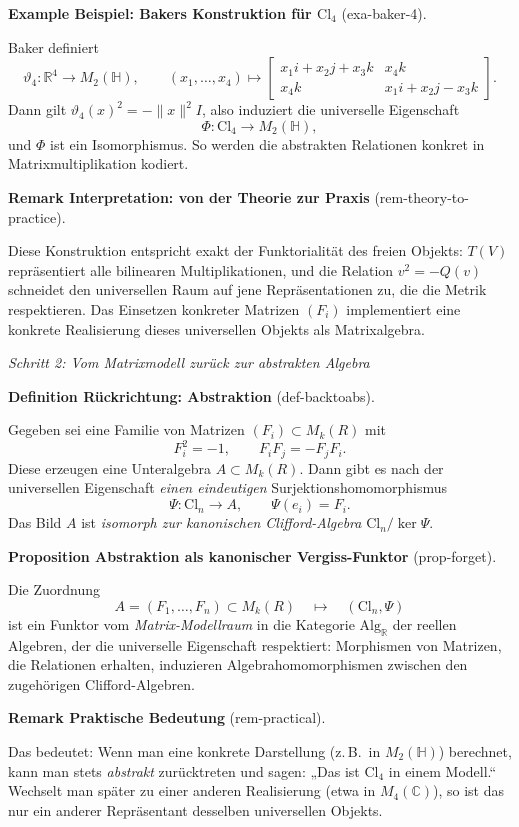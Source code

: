 \documentclass[10pt, letterpaper]{article}
\newcommand{\R}{\mathbb{R}}
\newcommand{\C}{\mathbb{C}}
\newcommand{\Alg}{\mathrm{Alg}}
\newcommand{\Cl}{\mathrm{Cl}}
\newcommand{\CustomHeading}[3]{%
  \par\medskip\noindent%
  \textbf{#1 #2} \textnormal{(#3)}.\enskip%
}
\newenvironment{DEF}[2]{\begin{unitbox}\CustomHeading{Definition}{#1}{#2}}{\end{unitbox}}
\newenvironment{PROP}[2]{\begin{unitbox}\CustomHeading{Proposition}{#1}{#2}}{\end{unitbox}}
\newenvironment{REM}[2]{\begin{unitbox}\CustomHeading{Remark}{#1}{#2}}{\end{unitbox}}
\newenvironment{EXA}[2]{\begin{unitbox}\CustomHeading{Example}{#1}{#2}}{\end{unitbox}}
\begin{document}
\begin{EXA}{Beispiel: Bakers Konstruktion für $\Cl_4$}{exa-baker-4}
Baker definiert
\[
\vartheta_4:\R^4\longrightarrow M_2(\mathbb{H}),\qquad
(x_1,\dots,x_4)\mapsto
\begin{bmatrix}
x_1 i+x_2 j+x_3 k & x_4 k\\
x_4 k & x_1 i+x_2 j - x_3 k
\end{bmatrix}.
\]
Dann gilt $\vartheta_4(x)^2=-\|x\|^2I$, also induziert die universelle Eigenschaft
\[
\Phi:\Cl_4\longrightarrow M_2(\mathbb{H}),
\]
und $\Phi$ ist ein Isomorphismus.
So werden die abstrakten Relationen konkret in Matrixmultiplikation kodiert.
\end{EXA}

\begin{REM}{Interpretation: von der Theorie zur Praxis}{rem-theory-to-practice}
Diese Konstruktion entspricht exakt der Funktorialität des freien Objekts:
$T(V)$ repräsentiert alle bilinearen Multiplikationen, und
die Relation $v^2=-Q(v)$ schneidet den universellen Raum auf
jene Repräsentationen zu, die die Metrik respektieren.
Das Einsetzen konkreter Matrizen $(F_i)$ implementiert
eine konkrete Realisierung dieses universellen Objekts
als Matrixalgebra.
\end{REM}

\emph{Schritt 2: Vom Matrixmodell zurück zur abstrakten Algebra}

\begin{DEF}{Rückrichtung: Abstraktion}{def-backtoabs}
Gegeben sei eine Familie von Matrizen $(F_i)\subset M_k(R)$ mit
\[
F_i^2=-1,\qquad F_iF_j=-F_jF_i.
\]
Diese erzeugen eine Unteralgebra $A\subset M_k(R)$.
Dann gibt es nach der universellen Eigenschaft \emph{einen eindeutigen}
Surjektionshomomorphismus
\[
\Psi:\Cl_n\longrightarrow A,\qquad \Psi(e_i)=F_i.
\]
Das Bild $A$ ist \emph{isomorph zur kanonischen Clifford-Algebra} $\Cl_n/\ker\Psi$.
\end{DEF}

\begin{PROP}{Abstraktion als kanonischer Vergiss-Funktor}{prop-forget}
Die Zuordnung
\[
A=(F_1,\dots,F_n)\subset M_k(R)\quad\longmapsto\quad (\Cl_n,\Psi)
\]
ist ein Funktor vom \emph{Matrix-Modellraum} in die Kategorie
$\Alg_\R$ der reellen Algebren, der die universelle Eigenschaft respektiert:
Morphismen von Matrizen, die Relationen erhalten, induzieren
Algebrahomomorphismen zwischen den zugehörigen Clifford-Algebren.
\end{PROP}

\begin{REM}{Praktische Bedeutung}{rem-practical}
Das bedeutet: Wenn man eine konkrete Darstellung (z.\,B.\ in $M_2(\mathbb{H})$)
berechnet, kann man stets \emph{abstrakt} zurücktreten und sagen:
„Das ist \(\Cl_4\) in einem Modell.“  
Wechselt man später zu einer anderen Realisierung (etwa in $M_4(\C)$),
so ist das nur ein anderer Repräsentant desselben universellen Objekts.
\end{REM}
\end{document}
